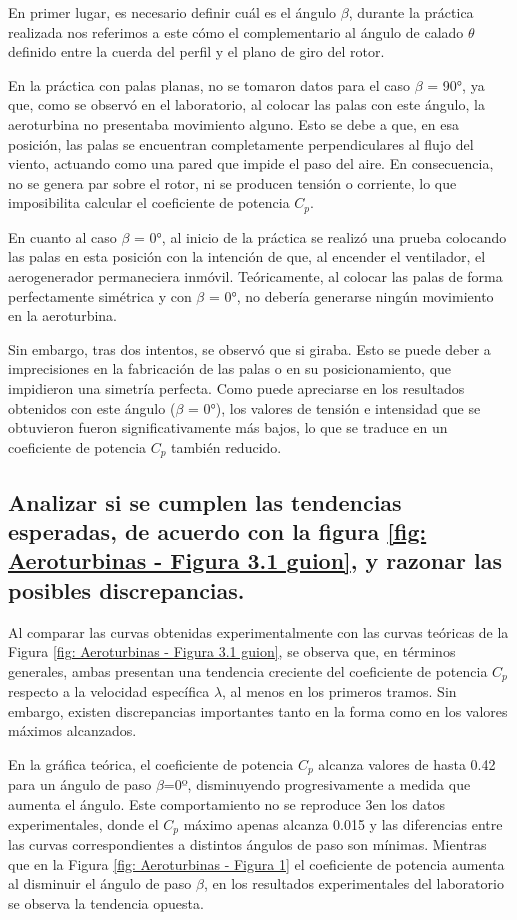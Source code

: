 \documentclass[10pt]{IEEEtran}
\begin{document}
En primer lugar, es necesario definir cuál es el ángulo $\beta$, durante la práctica realizada nos referimos a este cómo el complementario al ángulo de calado $\theta$ definido entre la cuerda del perfil y el plano de giro del rotor.

En la práctica con palas planas, no se tomaron datos para el caso $\beta$ = 90°, ya que, como se observó en el laboratorio, al colocar las palas con este ángulo, la aeroturbina no presentaba movimiento alguno. Esto se debe a que, en esa posición, las palas se encuentran completamente perpendiculares al flujo del viento, actuando como una pared que impide el paso del aire. En consecuencia, no se genera par sobre el rotor, ni se producen tensión o corriente, lo que imposibilita calcular el coeficiente de potencia $C_p$.

En cuanto al caso $\beta$ = 0°, al inicio de la práctica se realizó una prueba colocando las palas en esta posición con la intención de que, al encender el ventilador, el aerogenerador permaneciera inmóvil. Teóricamente, al colocar las palas de forma perfectamente simétrica y con $\beta$ = 0°, no debería generarse ningún movimiento en la aeroturbina.

Sin embargo, tras dos intentos, se observó que si giraba. Esto se puede deber a imprecisiones en la fabricación de las palas o en su posicionamiento, que impidieron una simetría perfecta. Como puede apreciarse en los resultados obtenidos con este ángulo ($\beta$ = 0°), los valores de tensión e intensidad que se obtuvieron fueron significativamente más bajos, lo que se traduce en un coeficiente de potencia $C_p$ también reducido.

\subsection{Analizar si se cumplen las tendencias esperadas, de acuerdo con la figura \ref{fig: Aeroturbinas - Figura 3.1 guion}, y razonar las posibles discrepancias.}

Al comparar las curvas obtenidas experimentalmente con las curvas teóricas de la Figura \ref{fig: Aeroturbinas - Figura 3.1 guion}, se observa que, en términos generales, ambas presentan una tendencia creciente del coeficiente de potencia $C_p$ respecto a la velocidad específica $\lambda$, al menos en los primeros tramos. Sin embargo, existen discrepancias importantes tanto en la forma como en los valores máximos alcanzados.

En la gráfica teórica, el coeficiente de potencia $C_p$ alcanza valores de hasta 0.42 para un ángulo de paso $\beta$=0º, disminuyendo progresivamente a medida que aumenta el ángulo. Este comportamiento no se reproduce 3en los datos experimentales, donde el $C_p$ máximo apenas alcanza 0.015 y las diferencias entre las curvas correspondientes a distintos ángulos de paso son mínimas. Mientras que en la Figura \ref{fig: Aeroturbinas - Figura 1} el coeficiente de potencia aumenta al disminuir el ángulo de paso $\beta$, en los resultados experimentales del laboratorio se observa la tendencia opuesta.
\end{document}
